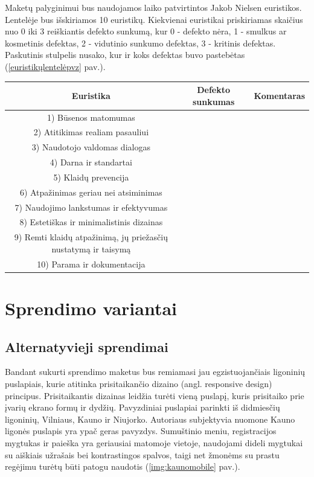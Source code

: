 \documentclass{VUMIFPSkursinis}
\begin{document}
Maketų palyginimui bus naudojamos laiko patvirtintos Jakob Nielsen euristikos\cite{NielsenHeuristicsEn}. Lentelėje bus išskiriamos 10 euristikų. Kiekvienai euristikai priskiriamas skaičius nuo 0 iki 3 reiškiantis defekto sunkumą, kur 0 - defekto nėra, 1 - smulkus ar kosmetinis defektas, 2 - vidutinio sunkumo defektas, 3 - kritinis defektas. Paskutinis stulpelis nusako, kur ir koks defektas buvo pastebėtas (\ref{euristikųlentelėpvz} pav.).
\begin{center}
\begin{tabular}{ |c|c|c| } 
 \hline
	Euristika & Defekto sunkumas & Komentaras \\ \hline
	1) Būsenos matomumas &  &  \\ \hline
	2) Atitikimas realiam pasauliui  &  &  \\ \hline
	3) Naudotojo valdomas dialogas &  &  \\ \hline
	4) Darna ir standartai &  &  \\ \hline
	5) Klaidų prevencija &  &  \\ \hline
	6) Atpažinimas geriau nei atsiminimas &  &  \\ \hline
	7) Naudojimo lankstumas ir efektyvumas &  &  \\ \hline
	8) Estetiškas ir minimalistinis dizainas &  &  \\ \hline
	9) Remti klaidų atpažinimą, jų priežasčių nustatymą ir taisymą &  &  \\ \hline
	10) Parama ir dokumentacija &  &  \\ \hline
\end{tabular}
\label{euristikųlentelėpvz}
\end{center}

\section{Sprendimo variantai}

\subsection{Alternatyvieji sprendimai}
Bandant sukurti sprendimo maketus bus remiamasi jau egzistuojančiais ligoninių puslapiais, kurie atitinka prisitaikančio dizaino (angl. responsive design) principus. Prisitaikantis dizainas leidžia turėti vieną puslapį, kuris prisitaiko prie įvarių ekrano formų ir dydžių\cite{RWDEn}. Pavyzdiniai puslapiai parinkti iš didmiesčių ligoninių, Vilniaus, Kauno ir Niujorko. Autoriaus subjektyvia nuomone Kauno ligonės puslapis yra ypač geras pavyzdys. Sumuštinio meniu, registracijos mygtukas ir paieška yra geriausiai matomoje vietoje, naudojami dideli mygtukai su aiškiais užrašais bei kontrastingos spalvos, taigi net žmonėms su prastu regėjimu turėtų būti patogu naudotis (\ref{img:kaunomobile} pav.).
\end{document}
